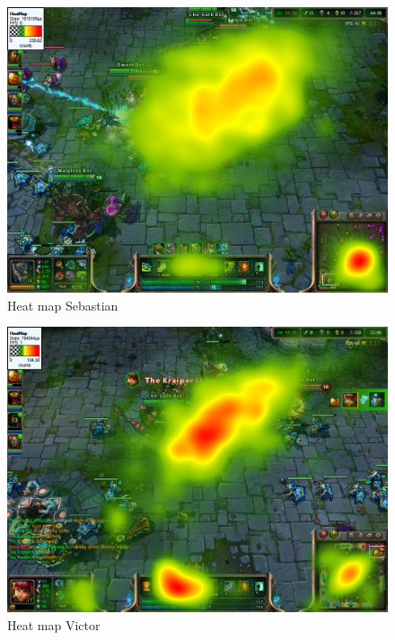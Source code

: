 \documentclass{article}
\begin{document}
\begin{figure}[h!]
\begin{center}
\includegraphics*[width=0.90\columnwidth]{images/heatmap/Sebastian}
\end{center}
\caption{Heat map Sebastian}
\label{heat_seb}
\end{figure}

\begin{figure}[h!]
\begin{center}
\includegraphics*[width=0.90\columnwidth]{images/heatmap/Victor}
\end{center}
\caption{Heat map Victor}
\label{heat_vic}
\end{figure}
\end{document}
